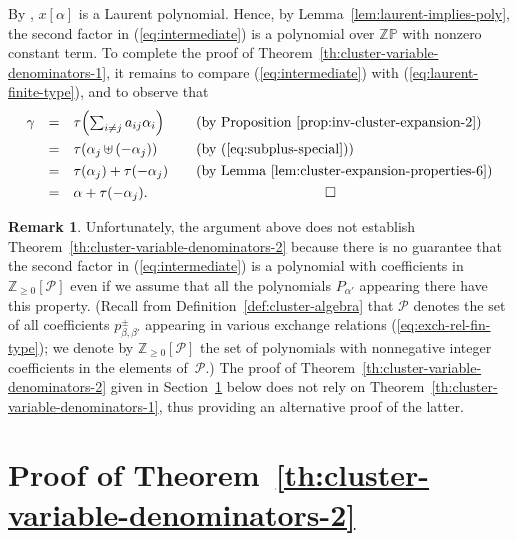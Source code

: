 \documentclass[letterpaper]{amsart}
\numberwithin{equation}{section}
\theoremstyle{definition}
\newtheorem{remark}[theorem]{Remark}
\def\endproof{\hfill$\square$\medskip}
\def\ZZ{\mathbb{Z}}
\def\PP{\mathbb{P}}
\def\subplus{{\,\uplus\,} }
\begin{document}
By \cite[Theorem~3.1]{fz-clust1}, $x[\alpha]$ is a Laurent polynomial. 
Hence, by Lemma~\ref{lem:laurent-implies-poly}, 
the second factor in (\ref{eq:intermediate}) 
is a polynomial over $\ZZ\PP$ with nonzero constant term. 
To complete the proof of Theorem~\ref{th:cluster-variable-denominators-1}, 
it remains to compare (\ref{eq:intermediate}) with 
(\ref{eq:laurent-finite-type}), and to observe that 
\[ 
\begin{array}{rclll} 
\gamma 
&=& \tau \Bigl(\sum_{i \neq j} a_{ij} \alpha_i\Bigr) 
&&\text{(by Proposition~\ref{prop:inv-cluster-expansion-2})} 
\\[.1in] 
&=& \tau (\alpha_j \subplus (-\alpha_j)) 
&&\text{(by (\ref{eq:subplus-special}))} 
\\[.05in] 
&=& \tau (\alpha_j) + \tau(-\alpha_j) 
&& \text{(by Lemma~\ref{lem:cluster-expansion-properties-6})} 
\\[.05in] 
&=&  \alpha + \tau (-\alpha_j). 
&&\hspace{1in}\qed 
\end{array} 
\] 
 
\begin{remark} 
Unfortunately, the argument above does not establish 
Theorem~\ref{th:cluster-variable-denominators-2} because 
there is no guarantee that the second factor in (\ref{eq:intermediate}) 
is a polynomial with coefficients in $\ZZ_{\geq 0}[\mathcal{P}]$ 
even if we assume that all the polynomials $P_{\alpha'}$ appearing 
there have this property. 
(Recall from Definition~\ref{def:cluster-algebra} 
that $\mathcal{P}$ denotes the set of all coefficients 
$p^\pm_{\beta,\beta'}$ appearing in various exchange relations 
(\ref{eq:exch-rel-fin-type}); we denote by 
$\mathbb{Z}_{\geq 0}[\mathcal{P}]$ the set of 
polynomials with nonnegative integer coefficients 
in the elements of~$\mathcal{P}$.) 
The proof of Theorem~\ref{th:cluster-variable-denominators-2} 
given in Section~\ref{sec:initial-cluster-positivity} below 
does not rely on Theorem~\ref{th:cluster-variable-denominators-1}, 
thus providing an alternative proof of the latter. 
\end{remark} 
 
\pagebreak[3] 
 
\section{Proof of Theorem~\ref{th:cluster-variable-denominators-2}} 
\label{sec:initial-cluster-positivity} 
 
\end{document}
